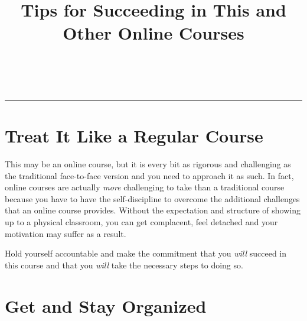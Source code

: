 \documentclass[12pt]{scrartcl}
\title{Tips for Succeeding in This and Other Online Courses}\let\Title\@title
\subtitle{Computer Science II\\
{\small
\vskip.5cm
Department of Computer Science \& Engineering \\
University of Nebraska--Lincoln}
\vskip-2cm}
\date{~}
\begin{document}
\maketitle

\hrule

\section{Treat It Like a Regular Course}

This may be an online course, but it is every bit as rigorous and challenging
as the traditional face-to-face version and you need to approach it as such.
In fact, online courses are actually \emph{more} challenging to take than 
a traditional course because you have to have the self-discipline to overcome
the additional challenges that an online course provides.  Without the expectation
and structure of showing up to a physical classroom, you can get complacent, 
feel detached and your motivation may suffer as a result.

Hold yourself accountable and make the commitment that you \emph{will} succeed
in this course and that you \emph{will} take the necessary steps to doing so.

\section{Get and Stay Organized}
\end{document}
